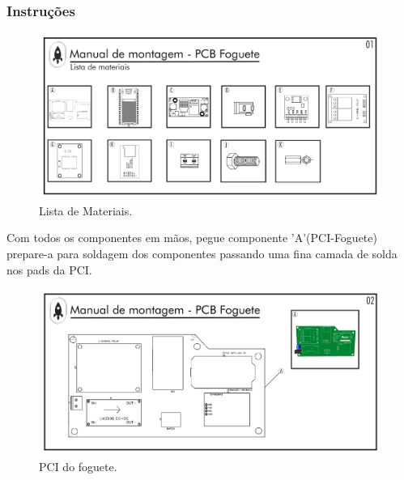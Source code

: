 \subsubsection{Instruções}


\begin{figure}[H]
  \centering
  \includegraphics[width=\textwidth]{Figuras/FOGUETE/Pg-01---PL-02.png}
  \caption{Lista de Materiais.} 
  \label{fig:Lista de materiais foguete}
\end{figure}



\par Com todos os componentes em mãos, pegue componente 'A'(PCI-Foguete) prepare-a para soldagem dos componentes passando uma fina camada de solda nos pads da PCI.

\begin{figure}[H]
  \centering
  \includegraphics[width=\textwidth]{Figuras/FOGUETE/Pg-02---PL-02.png}
  \caption{PCI do foguete.}
  \label{fig:PCIFoguete}
\end{figure}

